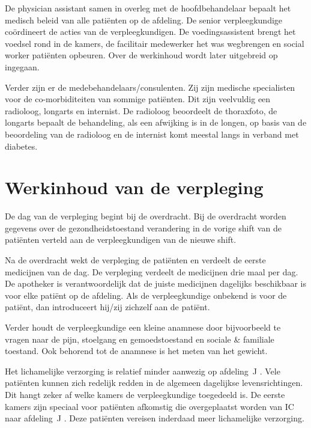 \documentclass[nohyper,nobib]{tufte-book} %
\newcommand{\afdelingj}{afdeling~J }
\begin{document}
    De physician assistant samen in overleg met de hoofdbehandelaar bepaalt het medisch beleid van alle patiënten op de afdeling. De senior verpleegkundige coördineert de acties van de verpleegkundigen. De voedingsassistent brengt het voedsel rond in de kamers, de facilitair medewerker het was wegbrengen en social worker patiënten opbeuren. Over de werkinhoud wordt later uitgebreid op ingegaan. 

    Verder zijn er de medebehandelaars/consulenten. Zij zijn medische specialisten voor de co-morbiditeiten van sommige patiënten. Dit zijn veelvuldig een radioloog, longarts en internist. De radioloog beoordeelt de thoraxfoto, de longarts bepaalt de behandeling, als een afwijking is in de longen, op basis van de beoordeling van de radioloog en de internist komt meestal langs in verband met diabetes.

    \section{Werkinhoud van de verpleging}
De dag van de verpleging begint bij de overdracht. Bij de overdracht worden gegevens over de gezondheidstoestand verandering in de vorige shift van de patiënten verteld aan de verpleegkundigen van de nieuwe shift. 

Na de overdracht wekt de verpleging de patiënten en verdeelt de eerste medicijnen van de dag. De verpleging verdeelt de medicijnen drie maal per dag. De apotheker is verantwoordelijk dat de juiste medicijnen dagelijks beschikbaar is voor elke patiënt op de afdeling. Als de verpleegkundige onbekend is voor de patiënt, dan introduceert hij/zij zichzelf aan de patiënt. 

Verder houdt de verpleegkundige een kleine anamnese door bijvoorbeeld te vragen naar de pijn, stoelgang en gemoedstoestand en sociale \& familiale toestand. Ook behorend tot de anamnese is het meten van het gewicht.

Het lichamelijke verzorging is relatief minder aanwezig op \afdelingj. Vele patiënten kunnen zich redelijk redden in de algemeen dagelijkse levensrichtingen. Dit hangt zeker af welke kamers de verpleegkundige toegedeeld is. De eerste kamers zijn speciaal voor patiënten afkomstig die overgeplaatst worden van IC naar \afdelingj. Deze patiënten vereisen inderdaad meer lichamelijke verzorging.
\end{document}
